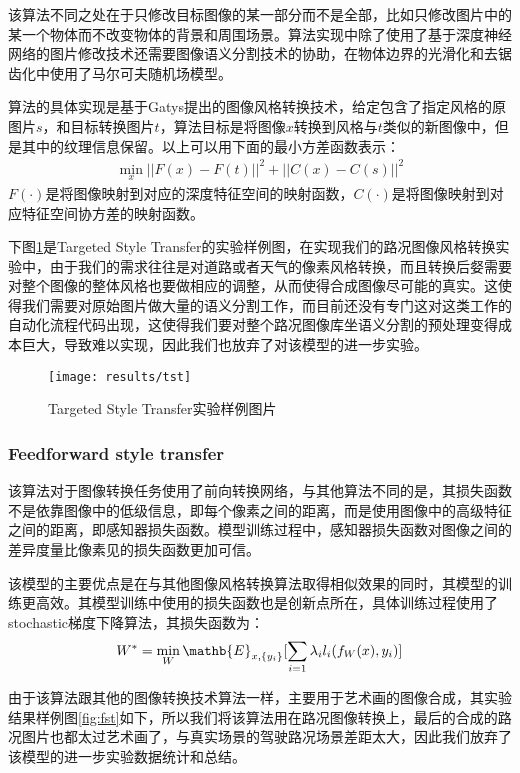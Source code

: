  该算法不同之处在于只修改目标图像的某一部分而不是全部，比如只修改图片中的某一个物体而不改变物体的背景和周围场景。算法实现中除了使用了基于深度神经网络的图片修改技术还需要图像语义分割技术的协助，在物体边界的光滑化和去锯齿化中使用了马尔可夫随机场模型。

算法的具体实现是基于Gatys提出的图像风格转换技术\cite{nst}，给定包含了指定风格的原图片$s$，和目标转换图片$t$，算法目标是将图像$x$转换到风格与$t$类似的新图像中，但是其中的纹理信息保留。以上可以用下面的最小方差函数表示：
\begin{align}
    \min_x ||F(x)-F(t)||^2+||C(x)-C(s)||^2
\end{align}
$F(\cdot)$是将图像映射到对应的深度特征空间的映射函数，$C(\cdot)$是将图像映射到对应特征空间协方差的映射函数。

下图\ref{fig:tst}是Targeted Style Transfer的实验样例图，在实现我们的路况图像风格转换实验中，由于我们的需求往往是对道路或者天气的像素风格转换，而且转换后㛑需要对整个图像的整体风格也要做相应的调整，从而使得合成图像尽可能的真实。这使得我们需要对原始图片做大量的语义分割工作，而目前还没有专门这对这类工作的自动化流程代码出现，这使得我们要对整个路况图像库坐语义分割的预处理变得成本巨大，导致难以实现，因此我们也放弃了对该模型的进一步实验。 

\begin{figure}[h]
    \centering
    \texttt{[image: results/tst]}
    \caption{Targeted Style Transfer实验样例图片}
    \label{fig:tst}
\end{figure}

\subsubsection{Feedforward style transfer}

 该算法对于图像转换任务使用了前向转换网络，与其他算法不同的是，其损失函数不是依靠图像中的低级信息，即每个像素之间的距离，而是使用图像中的高级特征之间的距离，即感知器损失函数。模型训练过程中，感知器损失函数对图像之间的差异度量比像素见的损失函数更加可信。

该模型的主要优点是在与其他图像风格转换算法取得相似效果的同时，其模型的训练更高效。其模型训练中使用的损失函数也是创新点所在，具体训练过程使用了stochastic梯度下降算法，其损失函数为：
\begin{align}
    W^*=\min_W\mathb{E}_{x,\{y_i\}}[\sum_{i=1}\lambda_il_i(f_W(x),y_i)]
\end{align}

由于该算法跟其他的图像转换技术算法一样，主要用于艺术画的图像合成，其实验结果样例图\ref{fig:fst}如下，所以我们将该算法用在路况图像转换上，最后的合成的路况图片也都太过艺术画了，与真实场景的驾驶路况场景差距太大，因此我们放弃了该模型的进一步实验数据统计和总结。 

